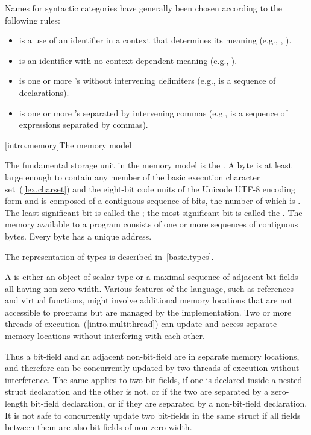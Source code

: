\pnum
Names for syntactic categories have generally been chosen according to
the following rules:
\begin{itemize}
\item {} is a use of an identifier in a context that
determines its meaning (e.g., ,
).
\item {} is an identifier with no context-dependent meaning
(e.g., ).
\item {} is one or more 's without intervening
delimiters (e.g.,  is a sequence of
declarations).
\item {} is one or more 's separated by
intervening commas (e.g.,  is a sequence of
expressions separated by commas).
\end{itemize}%

[intro.memory]{The \Cpp memory model}

\pnum
{}%
The fundamental storage unit in the \Cpp memory model is the
.
A byte is at least large enough to contain any member of the basic
%
execution character set~(\ref{lex.charset})
and the eight-bit code units of the Unicode UTF-8 encoding form
and is composed of a contiguous sequence of
bits, the number of which is . The least
significant bit is called the ; the most
significant bit is called the . The memory
available to a \Cpp program consists of one or more sequences of
contiguous bytes. Every byte has a unique address.

\pnum
\enternote The representation of types is described
in~\ref{basic.types}. \exitnote

\pnum
A  is either an object of scalar type or a maximal
sequence of adjacent bit-fields all having non-zero width. \enternote Various
features of the language, such as references and virtual functions, might
involve additional memory locations that are not accessible to programs but are
managed by the implementation. \exitnote Two or more threads of
execution~(\ref{intro.multithread}) can update and access separate memory
locations without interfering with each other.

\pnum
\enternote Thus a bit-field and an adjacent non-bit-field are in separate memory
locations, and therefore can be concurrently updated by two threads of execution
without interference. The same applies to two bit-fields, if one is declared
inside a nested struct declaration and the other is not, or if the two are
separated by a zero-length bit-field declaration, or if they are separated by a
non-bit-field declaration. It is not safe to concurrently update two bit-fields
in the same struct if all fields between them are also bit-fields of non-zero
width. \exitnote

